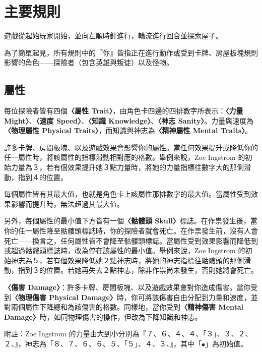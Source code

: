 
\section{主要規則} \label{sec:main}

遊戲從起始玩家開始，並向左順時針進行，輪流進行回合並探索屋子。

為了簡單起見，所有規則中的『你』皆指正在進行動作或受到卡牌、房屋板塊規則影響的角色——探險者（包含英雄與叛徒）以及怪物。


\subsection{屬性} \label{ssec:traits}

每位探險者皆有四個\textbf{〈屬性 Trait〉}，由角色卡四邊的四排數字所表示：\textbf{〈力量 Might〉}、\textbf{〈速度 Speed〉}、\textbf{〈知識 Knowledge〉}、\textbf{〈神志 Sanity〉}。力量與速度為\textbf{〈物理屬性 Physical Traits〉}，而知識與神志為\textbf{〈精神屬性 Mental Traits〉}。

許多卡牌、房間板塊、以及遊戲效果會影響你的屬性。當任何效果提升或降低你的任一屬性時，將該屬性的指標滑動相對應的格數。舉例來說，Zoe Ingstrom 的初始力量為３，若有個效果提升她３點力量時，將她的力量指標往數字大的那側滑動，指到４的位置。

每個屬性皆有其最大值，也就是角色卡上該屬性那排數字的最大值。當屬性受到效果影響而提升時，無法超過其最大值。

另外，每個屬性的最小值下方皆有一個\textbf{〈骷髏頭 Skull〉}\SkullSymbol{}標誌。在作祟發生後，當你的任一屬性降至骷髏頭標誌時，你的探險者就會死亡。在作祟發生前，沒有人會死亡——換言之，任何屬性皆不會降至骷髏頭標誌。當屬性受到效果影響而降低到或超過骷髏頭標誌時，改為停在該屬性的最小值。舉例來說，Zoe Ingstrom 的初始神志為５，若有個效果降低她２點神志時，將她的神志指標往骷髏頭的那側滑動，指到３的位置。若她再失去２點神志，除非作祟尚未發生，否則她將會死亡。

\textbf{〈傷害 Damage〉}：許多卡牌、房間板塊、以及遊戲效果會對你造成傷害。當你受到\textbf{〈物理傷害 Physical Damage〉}時，你可將該傷害自由分配到力量和速度，並對兩個屬性下降總和為該傷害的格數。同樣地，當你受到\textbf{〈精神傷害 Mental Damage〉}時，如同物理傷害的操作，但改為下降知識和神志。

附註：Zoe Ingstrom 的力量由大到小分別為『７、６、４、４、\textcolor{green!50!black}{「３」}、３、２、２、\SkullSymbol{}』，神志為「８、７、６、６、５、\textcolor{green!50!black}{「５」}、４、３、\SkullSymbol{}』，其中「$\bullet$」為初始值。


